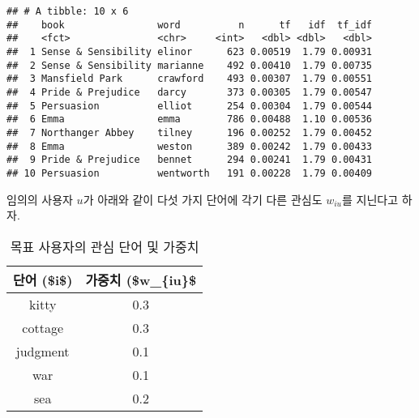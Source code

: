 \documentclass[]{book}
\newenvironment{Shaded}{\begin{snugshade}}{\end{snugshade}}
\newcommand{\DataTypeTok}[1]{\textcolor[rgb]{0.13,0.29,0.53}{#1}}
\newcommand{\FloatTok}[1]{\textcolor[rgb]{0.00,0.00,0.81}{#1}}
\newcommand{\KeywordTok}[1]{\textcolor[rgb]{0.13,0.29,0.53}{\textbf{#1}}}
\newcommand{\NormalTok}[1]{#1}
\newcommand{\OperatorTok}[1]{\textcolor[rgb]{0.81,0.36,0.00}{\textbf{#1}}}
\newcommand{\OtherTok}[1]{\textcolor[rgb]{0.56,0.35,0.01}{#1}}
\newcommand{\StringTok}[1]{\textcolor[rgb]{0.31,0.60,0.02}{#1}}
\begin{document}
\begin{verbatim}
## # A tibble: 10 x 6
##    book                word          n      tf   idf  tf_idf
##    <fct>               <chr>     <int>   <dbl> <dbl>   <dbl>
##  1 Sense & Sensibility elinor      623 0.00519  1.79 0.00931
##  2 Sense & Sensibility marianne    492 0.00410  1.79 0.00735
##  3 Mansfield Park      crawford    493 0.00307  1.79 0.00551
##  4 Pride & Prejudice   darcy       373 0.00305  1.79 0.00547
##  5 Persuasion          elliot      254 0.00304  1.79 0.00544
##  6 Emma                emma        786 0.00488  1.10 0.00536
##  7 Northanger Abbey    tilney      196 0.00252  1.79 0.00452
##  8 Emma                weston      389 0.00242  1.79 0.00433
##  9 Pride & Prejudice   bennet      294 0.00241  1.79 0.00431
## 10 Persuasion          wentworth   191 0.00228  1.79 0.00409
\end{verbatim}

임의의 사용자 \(u\)가 아래와 같이 다섯 가지 단어에 각기 다른 관심도 \(w_{iu}\)를 지닌다고 하자.

\begin{Shaded}
\end{Shaded}

\begin{table}[t]

\caption{\label{tab:word-of-interest}목표 사용자의 관심 단어 및 가중치}
\centering
\begin{tabular}{cc}
\toprule
단어 (\$i\$) & 가중치 (\$w\_\{iu\}\$\\
\midrule
kitty & 0.3\\
cottage & 0.3\\
judgment & 0.1\\
war & 0.1\\
sea & 0.2\\
\bottomrule
\end{tabular}
\end{table}
\end{document}
